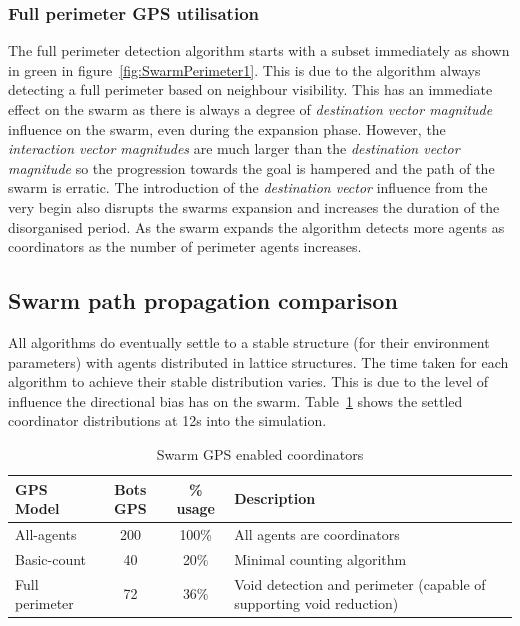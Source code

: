 \subsubsection{Full perimeter GPS utilisation\label{section:SwarmPerimeter4}}
The full perimeter detection algorithm starts with a subset immediately as shown in green in figure~\ref{fig:SwarmPerimeter1}. This is due to the algorithm always detecting a full perimeter based on neighbour visibility. This has an immediate effect on the swarm as there is always a degree of \textit{destination vector magnitude} influence on the swarm, even during the expansion phase. However, the \textit{interaction vector magnitudes} are much larger than the \textit{destination vector magnitude} so the progression towards the goal is hampered and the path of the swarm is erratic. The introduction of the \textit{destination vector} influence from the very begin also disrupts the swarms expansion and increases the duration of the disorganised period. As the swarm expands the algorithm detects more agents as coordinators as the number of perimeter agents increases.

\subsection{Swarm path propagation comparison\label{section:compareBaselineAll2}}
All algorithms do eventually settle to a stable structure (for their environment parameters) with agents distributed in lattice structures. The time taken for each algorithm to achieve their stable distribution varies. This is due to the level of influence the directional bias has on the swarm. Table~\ref{tab:GPSUsage} shows the settled coordinator distributions at 12s into the simulation.

\begin{table}[H]
\begin{center}
\begin{tabular}{| p{2.5cm} | c | c | p{5cm} |}
\hline
GPS Model & Bots GPS & \% usage & Description \\ \hline
All-agents & 200 & 100\% & All agents are coordinators \\ \hline
Basic-count & 40 & 20\% & Minimal counting algorithm\\ \hline
Full perimeter & 72 & 36\% & Void detection and perimeter (capable of supporting void reduction)\\  \hline
\end{tabular}\caption{Swarm GPS enabled coordinators} \label{tab:GPSUsage}
\end{center}
\end{table}

